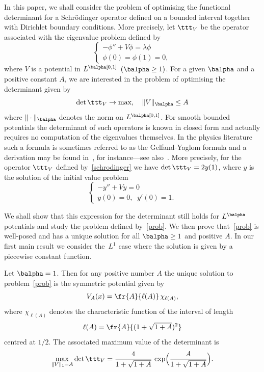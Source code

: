 In this paper, we shall consider the problem of optimising the functional determinant for a Schrödinger operator defined on a bounded interval
together with Dirichlet boundary conditions. More precisely, let $\ttt_V$ be the operator associated with the eigenvalue problem defined by
\begin{equation}
\label{schrodinger}
\begin{cases}
-\phi''+V\phi=\lambda \phi\\
\phi(0)=\phi(1)=0,
\end{cases}
\end{equation}
where $V$ is a potential in $L^\balpha[0,1]$ $(\balpha\geq 1)$. For a given $\balpha$ and a positive constant $A$, we are interested
in the problem of optimising the determinant given by
\begin{equation}\label{prob}
\det\ttt_V \to \max,\quad \|V\|_\balpha \leq A
\end{equation}
where $\| \cdot\|_\balpha$ denotes the norm on $L^\balpha[0,1]$.
For smooth bounded potentials the determinant of such operators is known in closed form and actually requires no computation of the
eigenvalues themselves. In the physics literature such a formula is sometimes referred to as the Gelfand-Yaglom formula and
a derivation may be found in~\cite{Levit-Smilansky}, for instance---see also~\cite{BFK}. More precisely, for the operator $\ttt_V$ defined
by~\eqref{schrodinger} we have $\det \ttt_V = 2y(1)$, where $y$ is the solution of the initial value problem
\begin{equation}
\label{controlproblem}
\begin{cases}
-y''+Vy=0\\
y(0)=0, \;\; y'(0)=1.
\end{cases}
\end{equation}

We shall show that this expression for the determinant still holds for $L^\balpha$ potentials and
study the problem defined by~\eqref{prob}. We then prove that~\eqref{prob} is well-posed and has a unique solution for all
$\balpha\geq 1$ and positive $A$.
In our first main result we consider the~$L^1$ case where the solution is given by
a piecewise constant function.

\begin{thmx} \label{thm1}
Let $\balpha=1$. Then for any positive number $A$ the unique solution to problem~\eqref{prob}
is the symmetric potential given by
\[
V_{A}(x) = \fr{A}{\ell(A)}\, \chi_{\ell(A)},
\]
where $\chi_{\ell(A)}$ denotes the characteristic function of the interval of length
\[
\ell(A) = \fr{A}{(1+\sqrt{1+A})^2}
\]
centred at $1/2$. The associated maximum value of the determinant is
\[
\max_{\| V\|_{1}=A } \det\ttt_V = \frac{4}{1+\sqrt{1+A}}\,\exp\Bigl(\frac{A}{1+\sqrt{1+A}} \Bigr).
\]
\end{thmx}

